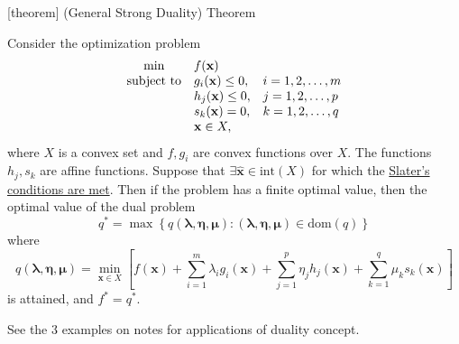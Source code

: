 \documentclass[12pt]{report}
\theoremstyle{definition}
\begin{document}
[theorem]
{(General Strong Duality) Theorem}
\begin{general strong duality theorem}
    Consider the optimization problem
    \begin{equation*}
        \begin{array}{c @{\quad} l @{\quad} l}
            \min & f(\mathbf{x}) & \\
            \text{subject to} & g_i(\mathbf{x})\le 0, & i=1,2,\ldots,m \\
                              & h_j(\mathbf{x})\le 0, & j=1,2,\ldots,p \\
                              & s_k(\mathbf{x})=0, & k=1,2,\ldots,q \\
                              & \mathbf{x}\in X,
        \end{array} 
    \end{equation*} 
    where $X$ is a convex set and $f,g_i$ are convex functions over $X$. The
    functions $h_j,s_k$ are affine functions. Suppose that $\exists
    \hat{\mathbf{x}}\in\text{int}(X)$ 
    for which the \underline{Slater's conditions are met}.
    Then if the problem has a finite optimal value, then the optimal value of
    the dual problem
    \[
        q^*=\max
        \left\{q(\pmb{\lambda},\pmb{\eta},\pmb{\mu}):(\pmb{\lambda},\pmb{\eta},\pmb{\mu})\in\text{dom}(q)\right\}
    \]
    where
    \[
        q(\pmb{\lambda},\pmb{\eta},\pmb{\mu})=\underset{\mathbf{x}\in X}{\min}
        \left[f(\mathbf{x})+\sum_{i=1}^{m}
        \lambda_ig_i(\mathbf{x})+\sum_{j=1}^{p}\eta_jh_j(\mathbf{x})+\sum_{k=1}^{q}\mu_ks_k(\mathbf{x})\right]
    \]
    is attained, and $f^*=q^*$.
\end{general strong duality theorem}

See the 3 examples on notes for applications of duality concept.
\end{document}
